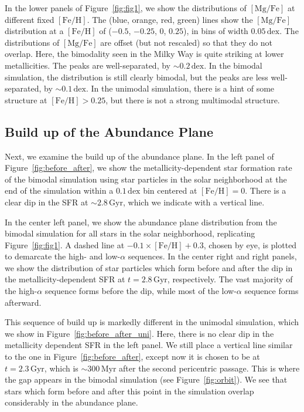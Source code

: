\documentclass[twocolumn,linenumbers,trackchanges]{aastex631}
\newcommand{\Gyr}{\ensuremath{\textrm{Gyr}}}
\newcommand{\Myr}{\ensuremath{\textrm{Myr}}}
\newcommand{\FeH}{\ensuremath{[\textrm{Fe}/\textrm{H}]}}
\newcommand{\MgFe}{\ensuremath{[\textrm{Mg}/\textrm{Fe}]}}
\newcommand{\dex}{\ensuremath{\textrm{dex}}}
\begin{document}
In the lower panels of Figure~\ref{fig:fig1}, we show the distributions of \MgFe{} at different fixed \FeH{}. The (blue, orange, red, green) lines show the \MgFe{} distribution at a \FeH{} of ($-0.5$, $-0.25$, $0$, $0.25$), in bins of width $0.05\,\dex$. The distributions of \MgFe{} are offset (but not rescaled) so that they do not overlap. Here, the bimodality seen in the Milky Way is quite striking at lower metallicities. The peaks are well-separated, by $\sim0.2\,\dex$. In the bimodal simulation, the distribution is still clearly bimodal, but the peaks are less well-separated, by $\sim0.1\,\dex$. In the unimodal simulation, there is a hint of some structure at $\FeH > 0.25$, but there is not a strong multimodal structure.

\subsection{Build up of the Abundance Plane}\label{ssec:abundplane_build}
Next, we examine the build up of the abundance plane. In the left panel of Figure~\ref{fig:before_after}, we show the metallicity-dependent star formation rate of the bimodal simulation using star particles in the solar neighborhood at the end of the simulation within a $0.1\,\dex$ bin centered at $\FeH=0$. There is a clear dip in the SFR at $\sim2.8\,\Gyr$, which we indicate with a vertical line.

In the center left panel, we show the abundance plane distribution from the bimodal simulation for all stars in the solar neighborhood, replicating Figure~\ref{fig:fig1}. A dashed line at $-0.1\times\FeH+0.3$, chosen by eye, is plotted to demarcate the high- and low-$\alpha$ sequences. In the center right and right panels, we show the distribution of star particles which form before and after the dip in the metallicity-dependent SFR at $t=2.8\,\Gyr$, respectively. The vast majority of the high-$\alpha$ sequence forms before the dip, while most of the low-$\alpha$ sequence forms afterward.

This sequence of build up is markedly different in the unimodal simulation, which we show in Figure~\ref{fig:before_after_uni}. Here, there is no clear dip in the metallicity dependent SFR in the left panel. We still place a vertical line similar to the one in Figure~\ref{fig:before_after}, except now it is chosen to be at $t=2.3\,\Gyr$, which is $\sim300\,\Myr$ after the second pericentric passage. This is where the gap appears in the bimodal simulation (see Figure~\ref{fig:orbit}). We see that stars which form before and after this point in the simulation overlap considerably in the abundance plane.
\end{document}

